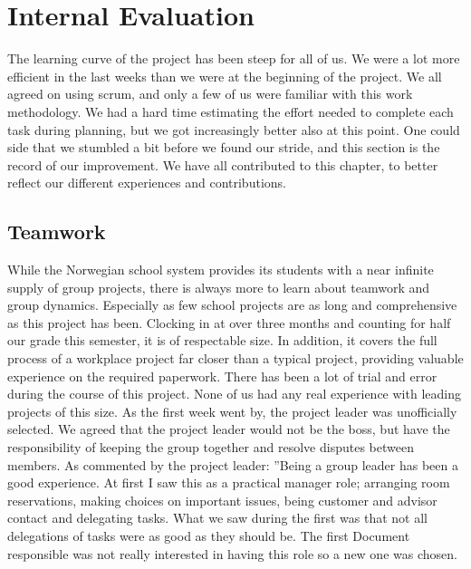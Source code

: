 \section{Internal Evaluation}\label{sec:refl_internal}
The learning curve of the project has been steep for all of us. We were a lot more efficient in the last weeks than we were at the beginning of the project. We all agreed on using scrum, and only a few of us were familiar with this work methodology. We had a hard time estimating the effort needed to complete each task during planning, but we got increasingly better also at this point. One could side that we stumbled a bit before we found our stride, and this section is the record of our improvement. We have all contributed to this chapter, to better reflect our different experiences and contributions.

\subsection{Teamwork}
While the Norwegian school system provides its students with a near infinite supply of group projects, there is always more to learn about teamwork and group dynamics. Especially as few school projects are as long and comprehensive as this project has been. Clocking in at over three months and counting for half our grade this semester, it is of respectable size. In addition, it covers the full process of a workplace project far closer than a typical project, providing valuable experience on the required paperwork.
\newline
\newline
There has been a lot of trial and error during the course of this project. None of us had any real experience with leading projects of this size. As the first week went by, the project leader was unofficially selected. We agreed that the project leader would not be the boss, but have the responsibility of keeping the group together and resolve disputes between members. As commented by the project leader:
\newline
\newline
''Being a group leader has been a good experience. At first I saw this as a practical manager role; arranging room reservations, making choices on important issues, being customer and advisor contact and delegating tasks.
\newline 
\newline
What we saw during the first was that not all delegations of tasks were as good as they should be. The first Document responsible was not really interested in having this role so a new one was chosen.
